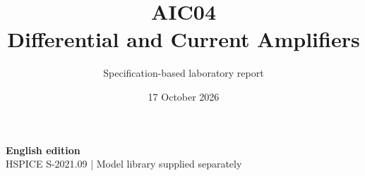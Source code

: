 \documentclass[11pt,a4paper]{article}
\title{\color{accent}AIC04\\[4pt]Differential and Current Amplifiers}
\author{Specification-based laboratory report}
\date{17 October 2026}
\begin{document}
\maketitle
\begin{center}\small\textbf{English edition}\\
HSPICE S-2021.09 \quad | \quad Model library supplied separately
\end{center}


\end{document}
